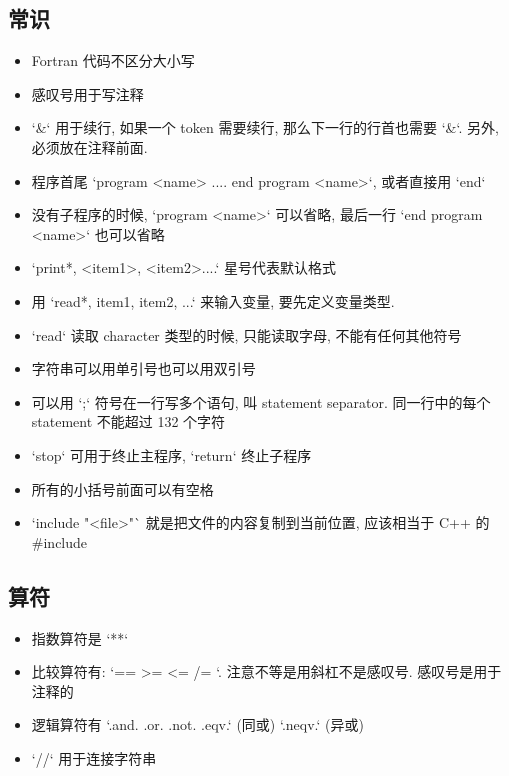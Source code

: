 
\subsection{常识}
\begin{itemize}
\item Fortran 代码不区分大小写
\item 感叹号用于写注释
\item `&` 用于续行, 如果一个 token 需要续行, 那么下一行的行首也需要 `&`. 另外, 必须放在注释前面.
\item 程序首尾  `program <name> ....  end program <name>`, 或者直接用 `end`
\item 没有子程序的时候, `program <name>` 可以省略, 最后一行 `end program <name>` 也可以省略
\item `print*, <item1>, <item2>....` 星号代表默认格式
\item 用 `read*, item1, item2, ...` 来输入变量, 要先定义变量类型. 
\item `read` 读取 character 类型的时候, 只能读取字母, 不能有任何其他符号
\item 字符串可以用单引号也可以用双引号
\item 可以用 `;` 符号在一行写多个语句, 叫 statement separator. 同一行中的每个 statement 不能超过 132 个字符
\item `stop` 可用于终止主程序, `return` 终止子程序
\item 所有的小括号前面可以有空格
\item `include "<file>"` 就是把文件的内容复制到当前位置, 应该相当于 C++ 的 #include
\end{itemize}

\subsection{算符}
\begin{itemize}
\item 指数算符是 `**`
\item 比较算符有: `==   >=   <=  /= `.  注意不等是用斜杠不是感叹号. 感叹号是用于注释的
\item 逻辑算符有 `.and.   .or.   .not.   .eqv.` (同或)  `.neqv.` (异或)
\item `//` 用于连接字符串
\end{itemize}

